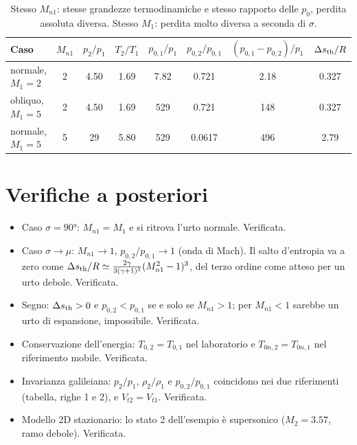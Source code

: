 \documentclass[11pt,a4paper]{article}
\newcommand{\sth}{s_{\rm th}}
\newcommand{\Mn}{M_{n1}}
\begin{document}
\begin{table}[H]
  \centering\small
  \setlength{\tabcolsep}{4pt}
  \begin{tabular}{lccccccc}
    \toprule
    Caso & $\Mn$ & $p_2/p_1$ & $T_2/T_1$ & $p_{0,1}/p_1$ & $p_{0,2}/p_{0,1}$ & $(p_{0,1}-p_{0,2})/p_1$ &
    $\Delta\sth/R$ \\
    \midrule
    normale, $M_1=2$             & 2 & \num{4.50} & \num{1.69} & \num{7.82} & \num{0.721} & \num{2.18} & \num{0.327} \\
    obliquo, $M_1=5$           & 2 & \num{4.50} & \num{1.69} & 529 & \num{0.721} & 148 & \num{0.327} \\
    normale, $M_1=5$             & 5 & 29 & \num{5.80} & 529 & \num{0.0617} & 496 & \num{2.79} \\
    \bottomrule
  \end{tabular}
  \caption{Stesso $\Mn$: stesse grandezze termodinamiche e stesso rapporto delle $p_0$, perdita assoluta
  diversa. Stesso $M_1$: perdita molto diversa a seconda di $\sigma$.}
  \label{tab:conf}
\end{table}

\section{Verifiche a posteriori}
\begin{itemize}
  \item Caso $\sigma=\ang{90}$: $\Mn=M_1$ e si ritrova l'urto normale. Verificata.
  \item Caso $\sigma\to\mu$: $\Mn\to1$, $p_{0,2}/p_{0,1}\to1$ (onda di Mach). Il salto d'entropia va a zero come
    $\Delta\sth/R\simeq\frac{2\gamma}{3(\gamma+1)^2}(\Mn^2-1)^3$, del terzo ordine come atteso per un urto debole.
    Verificata.
  \item Segno: $\Delta\sth>0$ e $p_{0,2}<p_{0,1}$ se e solo se $\Mn>1$; per $\Mn<1$ sarebbe un urto di
    espansione, impossibile. Verificata.
  \item Conservazione dell'energia: $T_{0,2}=T_{0,1}$ nel laboratorio e $T_{0n,2}=T_{0n,1}$ nel riferimento mobile.
    Verificata.
  \item Invarianza galileiana: $p_2/p_1$, $\rho_2/\rho_1$ e $p_{0,2}/p_{0,1}$ coincidono nei due riferimenti
    (tabella, righe 1 e 2), e $V_{t2}=V_{t1}$. Verificata.
  \item Modello 2D stazionario: lo stato 2 dell'esempio è supersonico ($M_2=\num{3.57}$, ramo debole). Verificata.
\end{itemize}
\end{document}
